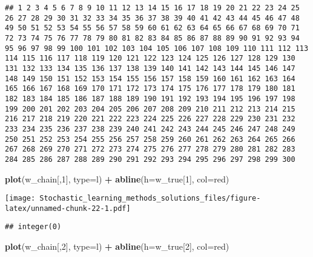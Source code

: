\documentclass[
]{article}
\newenvironment{Shaded}{\begin{snugshade}}{\end{snugshade}}
\newcommand{\DataTypeTok}[1]{\textcolor[rgb]{0.13,0.29,0.53}{#1}}
\newcommand{\DecValTok}[1]{\textcolor[rgb]{0.00,0.00,0.81}{#1}}
\newcommand{\KeywordTok}[1]{\textcolor[rgb]{0.13,0.29,0.53}{\textbf{#1}}}
\newcommand{\NormalTok}[1]{#1}
\newcommand{\OperatorTok}[1]{\textcolor[rgb]{0.81,0.36,0.00}{\textbf{#1}}}
\newcommand{\StringTok}[1]{\textcolor[rgb]{0.31,0.60,0.02}{#1}}
\begin{document}
\begin{verbatim}
## 1 2 3 4 5 6 7 8 9 10 11 12 13 14 15 16 17 18 19 20 21 22 23 24 25 26 27 28 29 30 31 32 33 34 35 36 37 38 39 40 41 42 43 44 45 46 47 48 49 50 51 52 53 54 55 56 57 58 59 60 61 62 63 64 65 66 67 68 69 70 71 72 73 74 75 76 77 78 79 80 81 82 83 84 85 86 87 88 89 90 91 92 93 94 95 96 97 98 99 100 101 102 103 104 105 106 107 108 109 110 111 112 113 114 115 116 117 118 119 120 121 122 123 124 125 126 127 128 129 130 131 132 133 134 135 136 137 138 139 140 141 142 143 144 145 146 147 148 149 150 151 152 153 154 155 156 157 158 159 160 161 162 163 164 165 166 167 168 169 170 171 172 173 174 175 176 177 178 179 180 181 182 183 184 185 186 187 188 189 190 191 192 193 194 195 196 197 198 199 200 201 202 203 204 205 206 207 208 209 210 211 212 213 214 215 216 217 218 219 220 221 222 223 224 225 226 227 228 229 230 231 232 233 234 235 236 237 238 239 240 241 242 243 244 245 246 247 248 249 250 251 252 253 254 255 256 257 258 259 260 261 262 263 264 265 266 267 268 269 270 271 272 273 274 275 276 277 278 279 280 281 282 283 284 285 286 287 288 289 290 291 292 293 294 295 296 297 298 299 300
\end{verbatim}

\begin{Shaded}
\begin{Highlighting}[]
\KeywordTok{plot}\NormalTok{(w\_chain[,}\DecValTok{1}\NormalTok{], }\DataTypeTok{type=}\StringTok{\textquotesingle{}l\textquotesingle{}}\NormalTok{) }\OperatorTok{+}
\KeywordTok{abline}\NormalTok{(}\DataTypeTok{h=}\NormalTok{w\_true[}\DecValTok{1}\NormalTok{], }\DataTypeTok{col=}\StringTok{\textquotesingle{}red\textquotesingle{}}\NormalTok{)}
\end{Highlighting}
\end{Shaded}

\texttt{[image: Stochastic\_learning\_methods\_solutions\_files/figure-latex/unnamed-chunk-22-1.pdf]}

\begin{verbatim}
## integer(0)
\end{verbatim}

\begin{Shaded}
\begin{Highlighting}[]
\KeywordTok{plot}\NormalTok{(w\_chain[,}\DecValTok{2}\NormalTok{], }\DataTypeTok{type=}\StringTok{\textquotesingle{}l\textquotesingle{}}\NormalTok{) }\OperatorTok{+}
\KeywordTok{abline}\NormalTok{(}\DataTypeTok{h=}\NormalTok{w\_true[}\DecValTok{2}\NormalTok{], }\DataTypeTok{col=}\StringTok{\textquotesingle{}red\textquotesingle{}}\NormalTok{)}
\end{Highlighting}
\end{Shaded}
\end{document}
